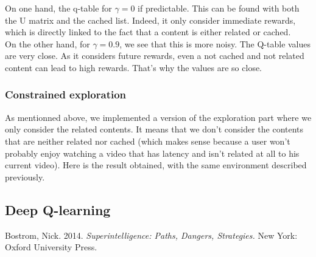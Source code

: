 \documentclass[a4paper]{article}
\begin{document}
	
	
	
	
	
	On one hand, the q-table for $\gamma = 0 $ if predictable. This can be found with both the U matrix and the cached list. Indeed, it only consider immediate rewards, which is directly linked to the fact that a content is either related or cached.  \\
	On the other hand, for $\gamma = 0.9$, we see that this is more noisy. The Q-table values are very close. As it considers future rewards, even a not cached and not related content can lead to high rewards. That's why the values are so close. \\
	 
	\subsubsection{Constrained exploration}
	As mentionned above, we implemented a version of the exploration part where we only consider the related contents. It means that we don't consider the contents that are neither related nor cached (which makes sense because a user won't probably enjoy watching a video that has latency and isn't related at all to his current video). Here is the result obtained, with the same environment described previously.




\subsection{Deep Q-learning}





\begin{thebibliography}{99}

Bostrom, Nick. 2014. \textit{Superintelligence: Paths, Dangers, Strategies.} New York: Oxford University Press.


\end{thebibliography}
\end{document}
